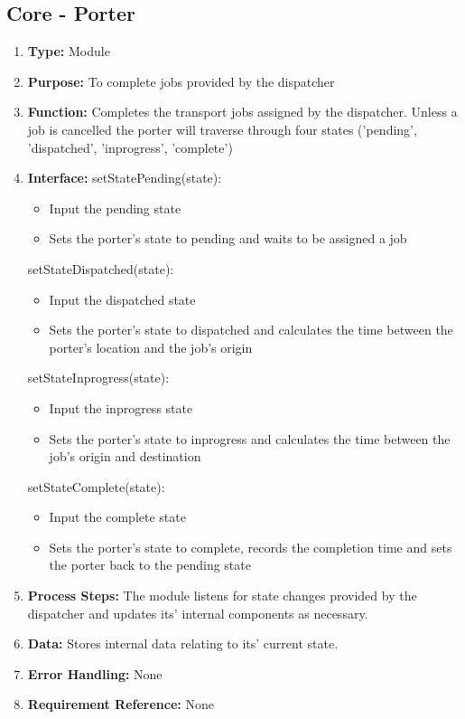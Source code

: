 \documentclass[paper=letter, fontsize=10pt]{scrartcl}
\numberwithin{equation}{section}		%
\numberwithin{figure}{section}			%
\numberwithin{table}{section}				%
\begin{document}
\subsection{Core - Porter}
\begin{enumerate}[]
	\item \textbf{Type:} Module
	\item \textbf{Purpose:}  To complete jobs provided by the dispatcher
	\item \textbf{Function:} Completes the transport jobs assigned by the dispatcher.  Unless a job is cancelled the porter will traverse through four states ('pending', 'dispatched', 'inprogress', 'complete')
	\item \textbf{Interface:} \newline
	setStatePending(state):
		\begin{itemize}
			\item Input the pending state
			\item Sets the porter's state to pending and waits to be assigned a job
		\end{itemize}
	setStateDispatched(state):
		\begin{itemize}
			\item Input the dispatched state
			\item Sets the porter's state to dispatched and calculates the time between the porter's location and the job's origin	
		\end{itemize}
	setStateInprogress(state):
		\begin{itemize}
			\item Input the inprogress state
			\item Sets the porter's state to inprogress and calculates the time between the job's origin and destination
		\end{itemize}
	setStateComplete(state):
		\begin{itemize}
			\item Input the complete state
			\item Sets the porter's state to complete, records the completion time and sets the porter back to the pending state
		\end{itemize}
	\item \textbf{Process Steps:} The module listens for state changes provided by the dispatcher and updates its' internal components as necessary.
	\item \textbf{Data:} Stores internal data relating to its' current state.
	\item \textbf{Error Handling:} None
	\item \textbf{Requirement Reference:} None
\end{enumerate}
\end{document}
